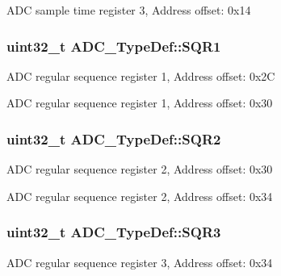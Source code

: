A\-D\-C sample time register 3, Address offset\-: 0x14 \hypertarget{struct_a_d_c___type_def_a0185aa54962ba987f192154fb7a2d673}{
\subsubsection[{S\-Q\-R1}]{ uint32\-\_\-t A\-D\-C\-\_\-\-Type\-Def\-::\-S\-Q\-R1}}\label{struct_a_d_c___type_def_a0185aa54962ba987f192154fb7a2d673}
A\-D\-C regular sequence register 1, Address offset\-: 0x2\-C

A\-D\-C regular sequence register 1, Address offset\-: 0x30 \hypertarget{struct_a_d_c___type_def_a6b6e55e6c667042e5a46a76518b73d5a}{
\subsubsection[{S\-Q\-R2}]{ uint32\-\_\-t A\-D\-C\-\_\-\-Type\-Def\-::\-S\-Q\-R2}}\label{struct_a_d_c___type_def_a6b6e55e6c667042e5a46a76518b73d5a}
A\-D\-C regular sequence register 2, Address offset\-: 0x30

A\-D\-C regular sequence register 2, Address offset\-: 0x34 \hypertarget{struct_a_d_c___type_def_a51dbdba74c4d3559157392109af68fc6}{
\subsubsection[{S\-Q\-R3}]{ uint32\-\_\-t A\-D\-C\-\_\-\-Type\-Def\-::\-S\-Q\-R3}}\label{struct_a_d_c___type_def_a51dbdba74c4d3559157392109af68fc6}
A\-D\-C regular sequence register 3, Address offset\-: 0x34

